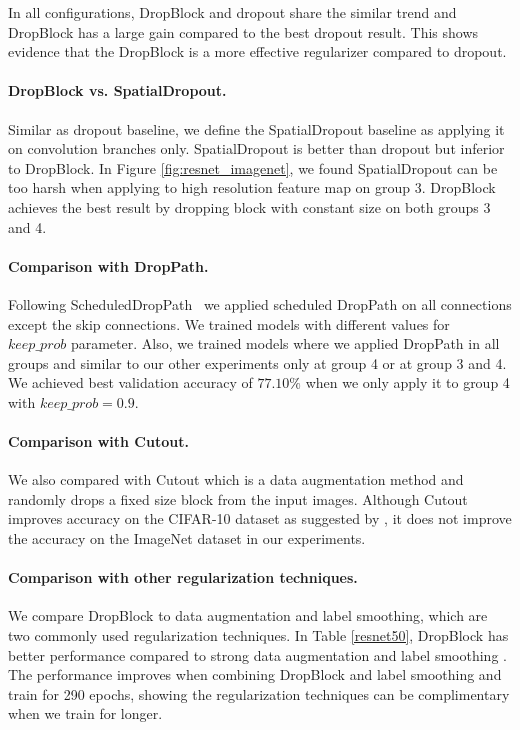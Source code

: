\documentclass{article}
\begin{document}
In all configurations, DropBlock and dropout share the similar trend and DropBlock has a large gain compared to the best dropout result. This shows evidence that the DropBlock is a more effective regularizer compared to dropout. 

\paragraph{DropBlock vs. SpatialDropout.}
Similar as dropout baseline, we define the SpatialDropout \cite{tompson2015spatialdropout} baseline as applying it on convolution branches only. SpatialDropout is better than dropout but inferior to DropBlock. In Figure \ref{fig:resnet_imagenet}, we found SpatialDropout can be too harsh when applying to high resolution feature map on group 3. DropBlock achieves the best result by dropping block with constant size on both groups 3 and 4.

\paragraph{Comparison with DropPath.}
Following ScheduledDropPath~\cite{zoph2017learning} we applied scheduled DropPath on all  connections except the skip connections. We trained models with different values for $keep\_prob$ parameter. Also, we trained models where we applied DropPath in all groups and similar to our other experiments only at group 4 or at group 3 and 4. We achieved best validation accuracy of $77.10\%$ when we only apply it to group 4 with $keep\_prob=0.9$.

\paragraph{Comparison with Cutout.}
We also compared with Cutout \cite{Cutout2017} which is a data augmentation method and randomly drops a fixed size block from the input images. Although Cutout improves accuracy on the CIFAR-10 dataset as suggested by \cite{Cutout2017}, it does not improve the accuracy on the ImageNet dataset in our experiments.

\paragraph{Comparison with other regularization techniques.}
 We compare DropBlock to data augmentation and label smoothing, which are two commonly used regularization techniques. In Table \ref{resnet50}, DropBlock has better performance compared to strong data augmentation \cite{cubuk2018autoaugment} and label smoothing \cite{smoothsoftmax2015}. The performance improves when combining DropBlock and label smoothing and train for 290 epochs, showing the regularization techniques can be complimentary when we train for longer.
\end{document}

